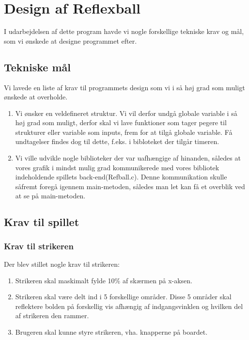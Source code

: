 \section{Design af Reflexball}
I udarbejdelsen af dette program havde vi nogle forskellige tekniske krav og mål, som vi ønskede at designe programmet efter.
\subsection{Tekniske mål}
Vi lavede en liste af krav til programmets design som vi i så høj grad som muligt ønskede at overholde. 
\begin{enumerate}
\item Vi ønsker en veldefineret struktur. Vi vil derfor undgå globale variable i så høj grad som muligt, derfor skal vi lave funktioner som tager pegere til strukturer eller variable som inputs, frem for at tilgå globale variable. Få undtagelser findes dog til dette, f.eks. i bibloteket der tilgår timeren.
\item Vi ville udvikle nogle biblioteker  der var uafhængige af hinanden, således at vores grafik i mindst mulig grad kommunikerede med vores bibliotek indeholdende spillets back-end(Refball.c). Denne kommunikation skulle såfremt foregå igennem main-metoden, således man let kan få et overblik ved at se på main-metoden.
	
\end{enumerate}


\subsection{Krav til spillet}
\subsubsection{Krav til strikeren}
Der blev stillet nogle krav til strikeren:
\begin{enumerate}
\item Strikeren skal maskimalt fylde 10\% af skærmen på x-aksen. 
\item  Strikeren skal være delt ind i 5 forskellige områder. Disse 5 områder skal reflektere bolden på forskellig vis afhængig af indgangsvinklen og hvilken del af strikeren den rammer. 
\item Brugeren skal kunne styre strikeren, vha. knapperne på boardet.
\end{enumerate}

